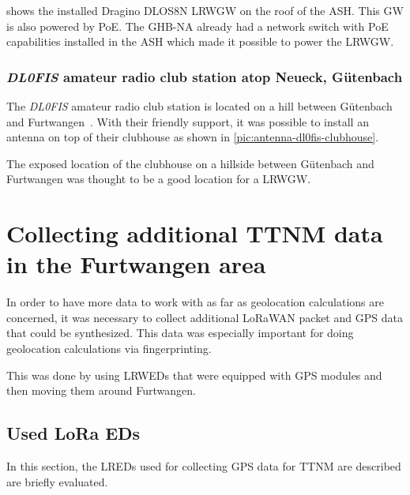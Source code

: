  shows the installed Dragino DLOS8N \acl{LRWGW} on the roof of the \ac{ASH}.
This \acl{GW} is also powered by \ac{PoE}.
The \acl{GHB-NA} already had a network switch with \ac{PoE} capabilities installed in the \ac{ASH} which made it possible to power the \acl{LRWGW}.

\subsubsection{\emph{DL0FIS} amateur radio club station atop Neueck, Gütenbach}

The \emph{DL0FIS} amateur radio club station is located on a hill between Gütenbach and Furtwangen~\cite{dl0fis_clubstation_2023}.
With their friendly support, it was possible to install an antenna on top of their clubhouse as shown in \cref{pic:antenna-dl0fis-clubhouse}.

The exposed location of the clubhouse on a hillside between Gütenbach and Furtwangen was thought to be a good location for a \acl{LRWGW}.

\section{Collecting additional \acl{TTNM} data in the Furtwangen area}\label{sec:collecting-additional-ttnm-data}

In order to have more data to work with as far as geolocation calculations are concerned, it was necessary to collect additional \ac{LoRaWAN} packet and \ac{GPS} data that could be synthesized.
This data was especially important for doing geolocation calculations via fingerprinting.

This was done by using \aclp{LRWED} that were equipped with \ac{GPS} modules and then moving them around Furtwangen.

\subsection{Used \acs{LoRa} \aclp{ED}}\label{subsec:used-lora-devices}

In this section, the \aclp{LRED} used for collecting \ac{GPS} data for \ac{TTNM} are described are briefly evaluated.

